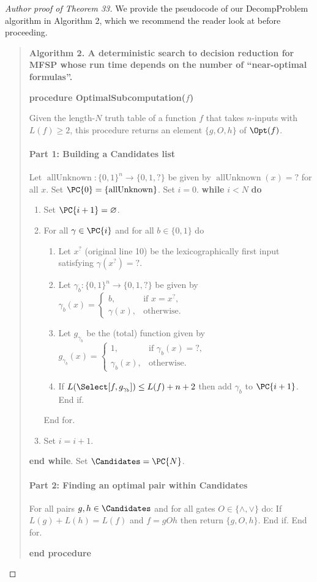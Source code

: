 \begin{proof}[Author proof of Theorem 33]
We provide the pseudocode of our DecompProblem algorithm in Algorithm 2, which we recommend the reader look at before proceeding.
\begin{quote}\textbf{Algorithm 2. A deterministic search to decision reduction for MFSP whose run time depends on the number of ``near-optimal formulas''.}\par
\textbf{procedure OptimalSubcomputation($f$)}\par
Given the length-$N$ truth table of a function $f$ that takes $n$-inputs with $L(f)\geq 2$, this procedure returns an element $\{g,O,h\}$ of $\Opt(f)$.
\paragraph{Part 1: Building a Candidates list}
Let $\operatorname{allUnknown}:\{0,1\}^n\to\{0,1,?\}$ be given by $\operatorname{allUnknown}(x)=?$ for all $x$. Set $\PC{0}=\{\operatorname{allUnknown}\}$. Set $i=0$.
\textbf{while} $i<N$ \textbf{do}
\begin{enumerate}
\item Set $\PC{i+1}=\varnothing$.
\item For all $\gamma\in\PC{i}$ and for all $b\in\{0,1\}$ do
\begin{enumerate}
\item Let $x^?$ (original line 10) be the lexicographically first input satisfying $\gamma(x^?)=?$.
\item Let $\gamma_b:\{0,1\}^n\to\{0,1,?\}$ be given by $\gamma_b(x)=\begin{cases}b,&\text{if }x=x^?,\\\gamma(x),&\text{otherwise}.\end{cases}$
\item Let $g_{\gamma_b}$ be the (total) function given by $g_{\gamma_b}(x)=\begin{cases}1,&\text{if }\gamma_b(x)=?,\\\gamma_b(x),&\text{otherwise}.\end{cases}$
\item If $L(\Select[f,g_{\gamma_b}])\leq L(f)+n+2$ then add $\gamma_b$ to $\PC{i+1}$. End if.
\end{enumerate}
End for.
\item Set $i=i+1$.
\end{enumerate}
\textbf{end while}. Set $\Candidates=\PC{N}$.
\paragraph{Part 2: Finding an optimal pair within Candidates}
For all pairs $g,h\in\Candidates$ and for all gates $O\in\{\land,\lor\}$ do: If $L(g)+L(h)=L(f)$ and $f=gOh$ then return $\{g,O,h\}$. End if. End for.\par
\textbf{end procedure}
\end{quote}

\end{proof}
